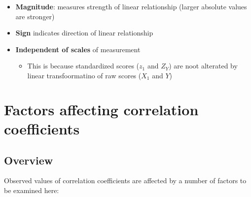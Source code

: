 \documentclass[
]{book}
\providecommand{\tightlist}{%
  \setlength{\itemsep}{0pt}\setlength{\parskip}{0pt}}
\begin{document}
\begin{itemize}
\tightlist
\item
  \textbf{Magnitude}: measures strength of linear relationship (larger absolute values are stronger)
\item
  \textbf{Sign} indicates direction of linear relationship
\item
  \textbf{Independent of scales} of measurement

  \begin{itemize}
  \tightlist
  \item
    This is because standardized scores (\(z_1\) and \(Z_Y\)) are noot alterated by linear transfoormatino of raw scores (\(X_1\) and \(Y\))
  \end{itemize}
\end{itemize}

\hypertarget{factors}{%
\chapter{Factors affecting correlation coefficients}\label{factors}}

\hypertarget{overview}{%
\section{Overview}\label{overview}}

Observed values of correlation coefficients are affected by a number of factors to be examined here:
\end{document}
